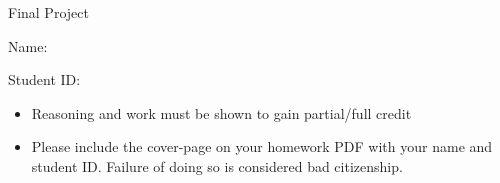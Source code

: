 \documentclass[11pt]{exam}
\begin{document}
\centerline{\Large \sc Final Project}
\pagestyle{empty}

\hrulefill

\vspace{2cm}

{\Large \sc Name:}




\vspace{2cm}


{\Large \sc Student ID:} 


\vspace{6cm}

\begin{itemize}
  \item Reasoning and work must be shown to gain partial/full
  credit
  \item Please include the cover-page on your homework PDF with your name and student ID. Failure of doing so is considered bad citizenship. 

 \end{itemize}
\end{document}
